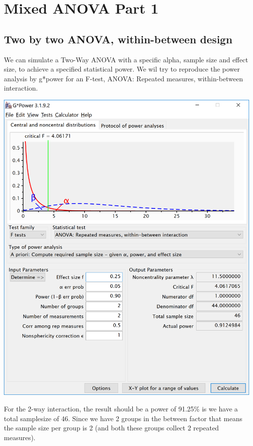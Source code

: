 \documentclass[]{book}
\begin{document}
\hypertarget{mixed-anova-part-1}{%
\chapter{Mixed ANOVA Part 1}\label{mixed-anova-part-1}}

\hypertarget{two-by-two-anova-within-between-design}{%
\section{Two by two ANOVA, within-between design}\label{two-by-two-anova-within-between-design}}

We can simulate a Two-Way ANOVA with a specific alpha, sample size and effect size, to achieve a specified statistical power. We wil try to reproduce the power analysis by g*power for an F-test, ANOVA: Repeated measures, within-between interaction.

\includegraphics{screenshots/gpower_5.png}

For the 2-way interaction, the result should be a power of 91.25\% is we have a total samplesize of 46. Since we have 2 groups in the between factor that means the sample size per group is 2 (and both these groups collect 2 repeated measures).
\end{document}
